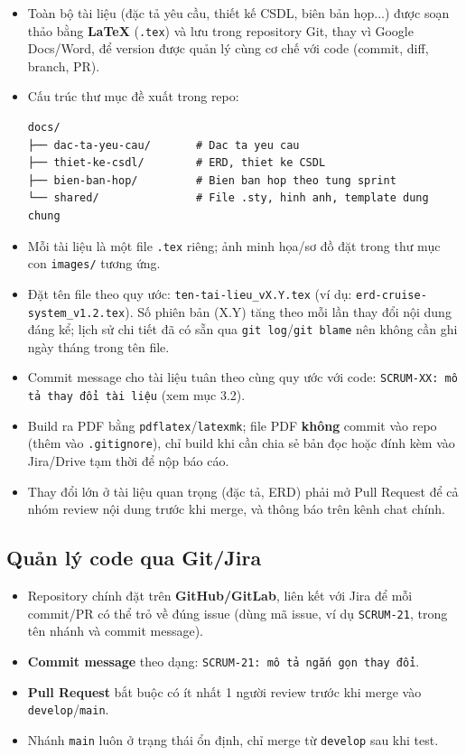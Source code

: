 \documentclass[a4paper,11pt]{article}
\begin{document}
\begin{itemize}[leftmargin=1.2cm]
  \item Toàn bộ tài liệu (đặc tả yêu cầu, thiết kế CSDL, biên bản họp...) được soạn thảo bằng \textbf{LaTeX} (\texttt{.tex}) và lưu trong repository Git, thay vì Google Docs/Word, để version được quản lý cùng cơ chế với code (commit, diff, branch, PR).
  \item Cấu trúc thư mục đề xuất trong repo:
\begin{verbatim}
docs/
├── dac-ta-yeu-cau/       # Dac ta yeu cau
├── thiet-ke-csdl/        # ERD, thiet ke CSDL
├── bien-ban-hop/         # Bien ban hop theo tung sprint
└── shared/               # File .sty, hinh anh, template dung chung
\end{verbatim}
  \item Mỗi tài liệu là một file \texttt{.tex} riêng; ảnh minh họa/sơ đồ đặt trong thư mục con \texttt{images/} tương ứng.
  \item Đặt tên file theo quy ước: \texttt{ten-tai-lieu\_vX.Y.tex} (ví dụ: \texttt{erd-cruise-system\_v1.2.tex}). Số phiên bản (X.Y) tăng theo mỗi lần thay đổi nội dung đáng kể; lịch sử chi tiết đã có sẵn qua \texttt{git log}/\texttt{git blame} nên không cần ghi ngày tháng trong tên file.
  \item Commit message cho tài liệu tuân theo cùng quy ước với code: \texttt{SCRUM-XX: mô tả thay đổi tài liệu} (xem mục 3.2).
  \item Build ra PDF bằng \texttt{pdflatex}/\texttt{latexmk}; file PDF \textbf{không} commit vào repo (thêm vào \texttt{.gitignore}), chỉ build khi cần chia sẻ bản đọc hoặc đính kèm vào Jira/Drive tạm thời để nộp báo cáo.
  \item Thay đổi lớn ở tài liệu quan trọng (đặc tả, ERD) phải mở Pull Request để cả nhóm review nội dung trước khi merge, và thông báo trên kênh chat chính.
\end{itemize}

\subsection{Quản lý code qua Git/Jira}

\begin{itemize}[leftmargin=1.2cm]
  \item Repository chính đặt trên \textbf{GitHub/GitLab}, liên kết với Jira để mỗi commit/PR có thể trỏ về đúng issue (dùng mã issue, ví dụ \texttt{SCRUM-21}, trong tên nhánh và commit message).
  \item \textbf{Commit message} theo dạng: \texttt{SCRUM-21: mô tả ngắn gọn thay đổi}.
  \item \textbf{Pull Request} bắt buộc có ít nhất 1 người review trước khi merge vào \texttt{develop}/\texttt{main}.
  \item Nhánh \texttt{main} luôn ở trạng thái ổn định, chỉ merge từ \texttt{develop} sau khi test.
\end{itemize}
\end{document}
